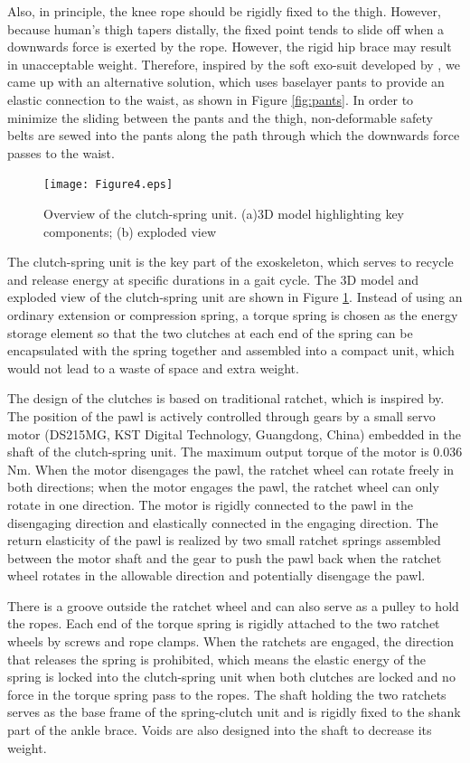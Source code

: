 \documentclass[twocolumn,cleanfoot,10pt]{asme2ej}
\begin{document}
Also, in principle, the knee rope should be rigidly fixed to the thigh. However, because human’s thigh tapers distally, the fixed point tends to slide off when a downwards force is exerted by the rope. However, the rigid hip brace may result in unacceptable weight. Therefore, inspired by the soft exo-suit developed by \cite{RN20}, we came up with an alternative solution, which uses baselayer pants to provide an elastic connection to the waist, as shown in Figure \ref{fig:pants}. In order to minimize the sliding between the pants and the thigh, non-deformable safety belts are sewed into the pants along the path through which the downwards force passes to the waist.

\begin{figure}[t]
	\centering
	\texttt{[image: Figure4.eps]}
	\caption{Overview of the clutch-spring unit. (a)3D model highlighting key components; (b) exploded view}
	\label{fig:clutch}   
\end{figure}

The clutch-spring unit is the key part of the exoskeleton, which serves to recycle and release energy at specific durations in a gait cycle. The 3D model and exploded view of the clutch-spring unit are shown in Figure \ref{fig:clutch}. Instead of using an ordinary extension or compression spring, a torque spring is chosen as the energy storage element so that the two clutches at each end of the spring can be encapsulated with the spring together and assembled into a compact unit, which would not lead to a waste of space and extra weight. 

The design of the clutches is based on traditional ratchet, which is inspired by\cite{RN19}. The position of the pawl is actively controlled through gears by a small servo motor (DS215MG, KST Digital Technology, Guangdong, China) embedded in the shaft of the clutch-spring unit. The maximum output torque of the motor is 0.036 Nm. When the motor disengages the pawl, the ratchet wheel can rotate freely in both directions; when the motor engages the pawl, the ratchet wheel can only rotate in one direction. The motor is rigidly connected to the pawl in the disengaging direction and elastically connected in the engaging direction. The return elasticity of the pawl is realized by two small ratchet springs assembled between the motor shaft and the gear to push the pawl back when the ratchet wheel rotates in the allowable direction and potentially disengage the pawl.

There is a groove outside the ratchet wheel and can also serve as a pulley to hold the ropes. Each end of the torque spring is rigidly attached to the two ratchet wheels by screws and rope clamps. When the ratchets are engaged, the direction that releases the spring is prohibited, which means the elastic energy of the spring is locked into the clutch-spring unit when both clutches are locked and no force in the torque spring pass to the ropes. The shaft holding the two ratchets serves as the base frame of the spring-clutch unit and is rigidly fixed to the shank part of the ankle brace. Voids are also designed into the shaft to decrease its weight.
\end{document}

